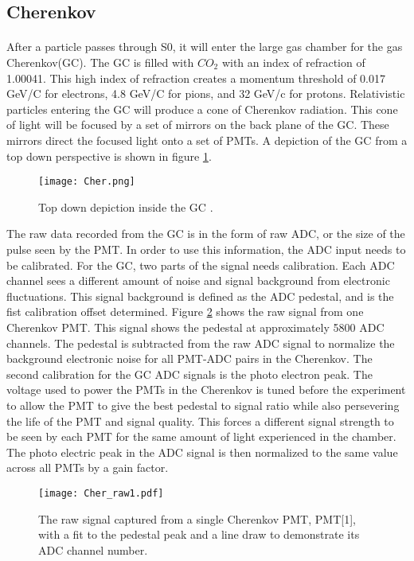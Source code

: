 	\subsection{Cherenkov}\label{sec:Cer}
	\paragraph{}After a particle passes through S0, it will enter the large gas chamber for the gas Cherenkov(GC). The GC is filled with $CO_2$ with an index of refraction of 1.00041. This high index of refraction creates a momentum threshold of 0.017 GeV/C for electrons, 4.8 GeV/C for pions, and 32 GeV/c for protons\cite{GasC}. Relativistic particles entering the GC will produce a cone of Cherenkov radiation. This cone of light will be focused by a set of mirrors on the back plane of the GC. These mirrors direct the focused light onto a set of PMTs. A depiction of the GC from a top down perspective is shown in figure \ref{fig:cer_TD}. 
	\begin{figure}[t]
		\centering
		\texttt{[image: Cher.png]}
		\caption{Top down depiction inside the GC \cite{GasC}.}
		\label{fig:cer_TD}
	\end{figure}
	The raw data recorded from the GC is in the form of raw ADC, or the size of the pulse seen by the PMT. In order to use this information, the ADC input needs to be calibrated. For the GC, two parts of the signal needs calibration. Each ADC channel sees a different amount of noise and signal background from electronic fluctuations. This signal background is defined as the ADC pedestal, and is the fist calibration offset determined. Figure \ref{fig:cer_raw} shows the raw signal from one Cherenkov PMT. This signal shows the pedestal at approximately 5800 ADC channels. The pedestal is subtracted from the raw ADC signal to normalize the background electronic noise for all PMT-ADC pairs in the Cherenkov. The second calibration for the GC ADC signals is the photo electron peak. The voltage used to power the PMTs in the Cherenkov is tuned before the experiment to allow the PMT to give the best pedestal to signal ratio while also persevering the life of the PMT and signal quality. This forces a different signal strength to be seen by each PMT for the same amount of light experienced in the chamber. The photo electric peak in the ADC signal is then normalized to the same value across all PMTs by a gain factor. 
	\begin{figure}[t]
		\centering
		\texttt{[image: Cher\_raw1.pdf]}
		\caption{The raw signal captured from a single Cherenkov PMT, PMT[1], with a fit to the pedestal peak and a line draw to demonstrate its ADC channel number.}
		\label{fig:cer_raw}
	\end{figure}
